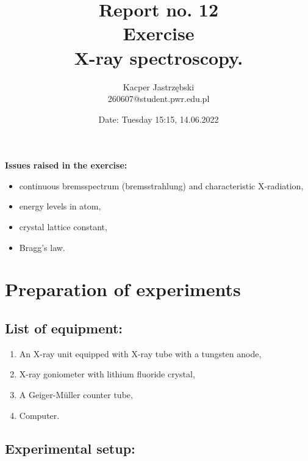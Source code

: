 \documentclass[12pt, a4paper]{extarticle}
\title{
	Report no. 12 \\
	\vspace{\baselineskip}
	\large
	\textbf{Exercise \experiment} \\
	X-ray spectroscopy.
}
\author{
	Kacper Jastrzębski\\
	260607@student.pwr.edu.pl
}
\date{Date: Tuesday 15:15, 14.06.2022}
\begin{document}
	\maketitle
	\vspace{1.5cm}

	\textbf{Issues raised in the exercise:}
	\begin{itemize}
		\setlength\itemsep{-0.2em}
		\item continuous bremsspectrum (bremsstrahlung) and characteristic X-radiation,
		\item energy levels in atom,
		\item crystal lattice constant,
		\item Bragg’s law.
	\end{itemize}
	\vspace{1cm}


	\tableofcontents

	\pagebreak

	\section{Preparation of experiments}


	\subsection{List of equipment:}


	\begin{enumerate}
		\setlength\itemsep{-0.5em}
		\item An X-ray unit equipped with X-ray tube with a tungsten anode,
		\item X-ray goniometer with lithium fluoride crystal,
		\item A Geiger-Müller counter tube,
		\item Computer.
	\end{enumerate}



	\subsection{Experimental setup:}


\end{document}
